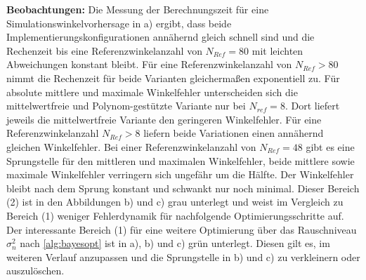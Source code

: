 \textbf{Beobachtungen:} Die Messung der Berechnungszeit für eine Simulationswinkelvorhersage in a) ergibt, dass beide Implementierungskonfigurationen annähernd gleich schnell sind und die Rechenzeit bis eine Referenzwinkelanzahl von $N_{Ref} = 80$ mit leichten Abweichungen konstant bleibt. Für eine Referenzwinkelanzahl von $N_{Ref} > 80$ nimmt die Rechenzeit für beide Varianten gleichermaßen exponentiell zu. Für absolute mittlere und maximale Winkelfehler unterscheiden sich die mittelwertfreie und Polynom-gestützte Variante nur bei $N_{ref} = 8$. Dort liefert jeweils die mittelwertfreie Variante den geringeren Winkelfehler. Für eine Referenzwinkelanzahl $N_{Ref} > 8$ liefern beide Variationen einen annähernd gleichen Winkelfehler. Bei einer Referenzwinkelanzahl von $N_{Ref} = 48$ gibt es eine Sprungstelle für den mittleren und maximalen Winkelfehler, beide mittlere sowie maximale Winkelfehler verringern sich ungefähr um die Hälfte. Der Winkelfehler bleibt nach dem Sprung konstant und schwankt nur noch minimal. Dieser Bereich (2) ist in den Abbildungen b) und c) grau unterlegt und weist im Vergleich zu Bereich (1) weniger Fehlerdynamik für nachfolgende Optimierungsschritte auf. Der interessante Bereich (1) für eine weitere Optimierung über das Rauschniveau $\sigma_n^2$ nach \autoref{alg:bayesopt} ist in a), b) und c) grün unterlegt. Diesen gilt es, im weiteren Verlauf anzupassen und die Sprungstelle in b) und c) zu verkleinern oder auszulöschen.


